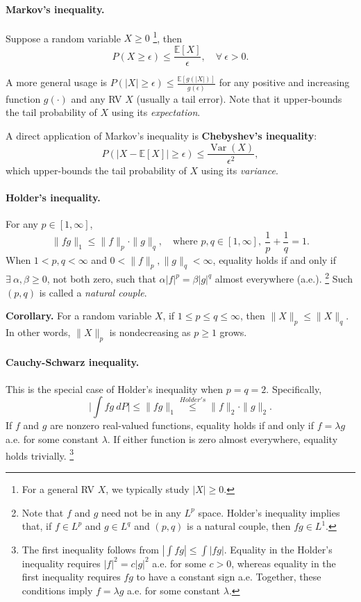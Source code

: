 \documentclass{article}
\theoremstyle{break}
\newcommand{\E}{\ensuremath{\mathbb{E}}}
\DeclareMathOperator{\Var}{Var}
\begin{document}
\paragraph{Markov's inequality.} Suppose a random variable $X \geq 0$
\footnote{For a general RV $X$, we typically study $|X| \geq 0$.}, then
\[
P(X\geq \epsilon) \leq \frac{\E[X]}{\epsilon}, \quad \forall\ \epsilon>0.
\]

A more general usage is $P(|X| \geq \epsilon) \leq \frac{\E[g(|X|)]}{g(\epsilon)}$ for any positive and increasing function $g(\cdot)$ and any RV $X$ (usually a tail error). Note that it upper-bounds the tail probability of $X$ using its \emph{expectation}.

A direct application of Markov's inequality is \textbf{Chebyshev's inequality}:
\[
P(|X - \E[X]| \geq \epsilon) \leq \frac{\Var(X)}{\epsilon^2},
\]
which upper-bounds the tail probability of $X$ using its \emph{variance}.

\paragraph{Holder's inequality.}

For any $p \in [1,\infty]$,
\[
\|fg\|_1 \leq \|f\|_p \cdot \|g\|_q, \quad\text{where } p,q\in[1,\infty],\ \frac{1}{p} + \frac{1}{q}=1.
\]
When $1<p,q<\infty$ and $0 < \| f \|_p, \| g \|_q < \infty$, equality holds if and only if $\exists\ \alpha,\beta\geq0$, not both zero, such that $\alpha|f|^p=\beta|g|^q$ almost everywhere (a.e.). 
\footnote{Note that $f$ and $g$ need not be in any $L^p$ space. Holder's inequality implies that, if $f \in L^p$ and $g \in L^q$ and $(p,q)$ is a natural couple, then $fg \in L^1$.} 
Such $(p,q)$ is called a \emph{natural couple}.

\textbf{Corollary.} For a random variable $X$, if $1 \leq p \leq q \leq \infty$, then $\|X\|_p \leq \|X\|_q$. In other words, $\| X \|_p$ is nondecreasing as $p \geq 1$ grows.


\paragraph{Cauchy-Schwarz inequality.}
This is the special case of Holder's inequality when $p=q=2$. Specifically,
\[
\Big|\int fg\ dP \Big| \leq \|fg\|_1 \stackrel{Holder's}{\leq} \|f\|_2 \cdot \|g\|_2.
\]
If \(f\) and \(g\) are nonzero real-valued functions, equality holds if and only if $f=\lambda g$ a.e. for some constant $\lambda$. If either function is zero almost everywhere, equality holds trivially.
\footnote{The first inequality follows from $|\int fg| \leq \int |fg|$.
Equality in the Holder's inequality requires $|f|^2=c|g|^2$ a.e. for some $c>0$, whereas equality in the first inequality requires $fg$ to have a constant sign a.e. Together, these conditions imply $f=\lambda g$ a.e. for some constant $\lambda$.}
\end{document}
